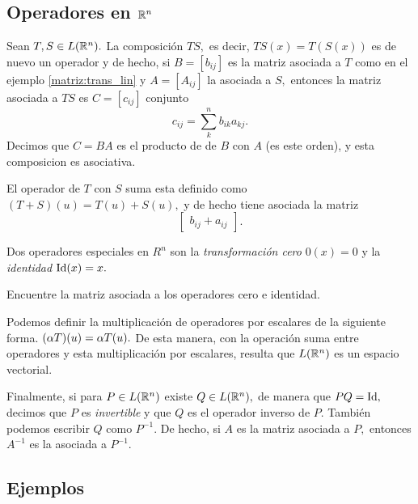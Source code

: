 \subsection*{Operadores en  $\mathbb{R}^{n}$}

Sean $T,S \in L(\mathbb{R}^{n}).$ La composici\'on $TS,$ es decir, $TS(x)=T(S(x))$ es de nuevo un operador y de hecho, si 
$B=[b_{ij}]$ es la matriz asociada a $T$ como en el ejemplo \ref{matriz:trans_lin} y $A=[A_{ij}]$ la asociada a $S,$
entonces la matriz asociada a $TS$ es $C=[c_{ij}]$ conjunto $$
c_{ij}=\sum_{k}^{n}b_{ik}a_{kj}.
$$
Decimos que $C=BA$ es el producto de de $B$ con $A$ (es este orden), y esta composicion es asociativa.

El operador de $T$ con $S$ suma esta definido como $(T+S)(u)=T(u)+S(u),$ y de hecho tiene asociada la matriz $$
\begin{bmatrix}
 b_{ij}+a_{ij}
\end{bmatrix}.
$$

Dos operadores especiales en $R^{n}$ son la \emph{transformaci\'on cero} $0(x)=0$ y la \emph{identidad} $\operatorname{Id}(x)=x.$
\begin{problema}[\dag]
 Encuentre la matriz asociada a los operadores cero e identidad. 
\end{problema}

Podemos definir la multiplicaci\'on de operadores por escalares de la siguiente forma. $(\alpha T)(u)=\alpha T(u).$ De esta
manera, con la operaci\'on suma entre operadores y esta multiplicaci\'on por escalares, resulta que $L(\mathbb{R}^{n})$ es un
espacio vectorial.

Finalmente, si para $P\in L(\mathbb{R}^{n})$ existe $Q\in L(\mathbb{R}^{n}),$ de manera que $PQ=\operatorname{Id},$ decimos que $P$ es
\emph{invertible} y que $Q$ es el operador inverso de $P.$ Tambi\'en podemos escribir $Q$ como $P^{-1}.$
De hecho, si $A$ es la matriz asociada a $P,$ entonces $A^{-1}$ es la asociada a $P^{-1}.$




\subsection*{Ejemplos}

